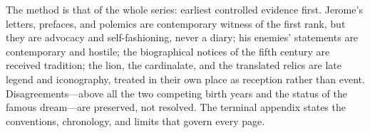 The method is that of the whole series: earliest controlled evidence first.
Jerome's letters, prefaces, and polemics are contemporary witness of the first
rank, but they are advocacy and self-fashioning, never a diary; his enemies'
statements are contemporary and hostile; the biographical notices of the fifth
century are received tradition; the lion, the cardinalate, and the translated
relics are late legend and iconography, treated in their own place as
reception rather than event. Disagreements---above all the two competing birth
years and the status of the famous dream---are preserved, not resolved. The
terminal appendix states the conventions, chronology, and limits that govern
every page.
